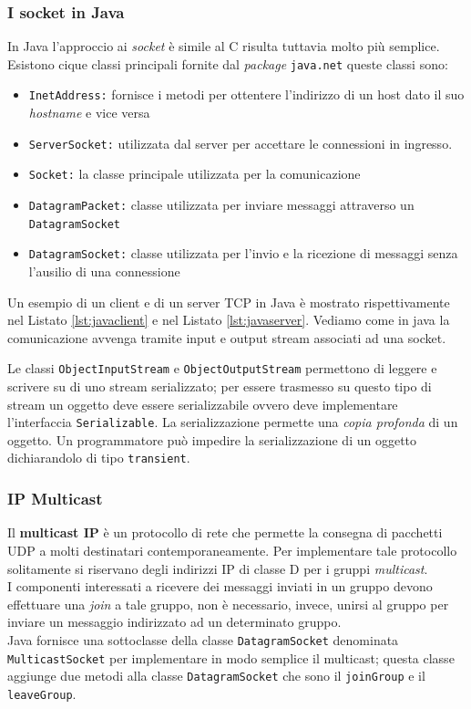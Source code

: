 \subsubsection{I socket in Java}
In Java l'approccio ai \emph{socket} è simile al C risulta tuttavia molto più semplice. Esistono cique classi principali fornite dal \emph{package} \texttt{java.net} queste classi sono:
\begin{itemize}
\item \texttt{InetAddress:} fornisce i metodi per ottentere l'indirizzo di un host dato il suo \emph{hostname} e vice versa
\item \texttt{ServerSocket:} utilizzata dal server per accettare le connessioni in ingresso.
\item \texttt{Socket:} la classe principale utilizzata per la comunicazione
\item \texttt{DatagramPacket:} classe utilizzata per inviare messaggi attraverso un  \texttt{DatagramSocket}
\item \texttt{DatagramSocket:} classe utilizzata per l'invio e la ricezione di messaggi senza l'ausilio di una connessione
\end{itemize}
Un esempio di un client e di un server TCP in Java è mostrato rispettivamente nel Listato \ref{lst:javaclient} e nel Listato \ref{lst:javaserver}.
Vediamo come in java la comunicazione avvenga tramite input e output stream associati ad una socket.


Le classi \texttt{ObjectInputStream} e \texttt{ObjectOutputStream} permettono di leggere e scrivere su di uno stream serializzato; per essere trasmesso su questo tipo di stream un oggetto deve essere serializzabile ovvero deve implementare l'interfaccia \texttt{Serializable}. La serializzazione permette una \emph{copia profonda} di un oggetto. Un programmatore può impedire la serializzazione di un oggetto dichiarandolo di tipo \texttt{transient}.
\subsubsection{IP Multicast}
Il \textbf{multicast IP} è un protocollo di rete che permette la consegna di pacchetti UDP a molti destinatari contemporaneamente. Per implementare tale protocollo solitamente si riservano degli indirizzi IP di classe D per i gruppi \emph{multicast}.\\
I componenti interessati a ricevere dei messaggi inviati in un gruppo devono effettuare una \emph{join} a tale gruppo, non è necessario, invece, unirsi al gruppo per inviare un messaggio indirizzato ad un determinato gruppo.\\
Java fornisce una sottoclasse della classe \texttt{DatagramSocket} denominata \texttt{MulticastSocket} per implementare in modo semplice il multicast; questa classe aggiunge due metodi alla classe \texttt{DatagramSocket} che sono il \texttt{joinGroup} e il \texttt{leaveGroup}.
